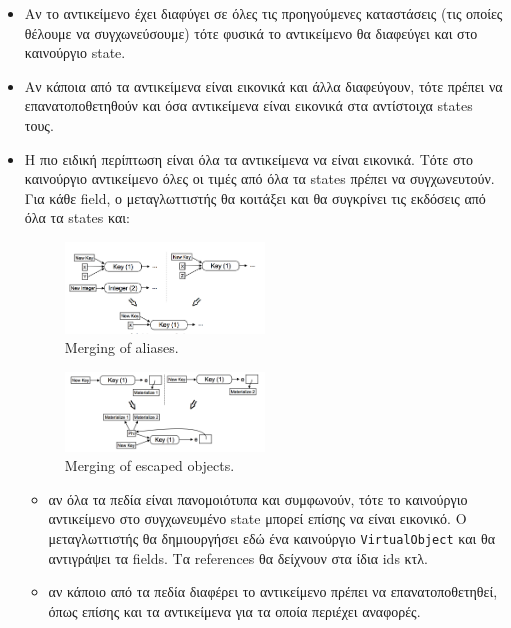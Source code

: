 \begin{itemize}

\item Αν το αντικείμενο έχει διαφύγει σε όλες τις προηγούμενες καταστάσεις (τις
οποίες θέλουμε να συγχωνεύσουμε) τότε φυσικά το αντικείμενο θα διαφεύγει και στο
καινούργιο state.

\item Αν κάποια από τα αντικείμενα είναι εικονικά και άλλα διαφεύγουν, τότε
πρέπει να επανατοποθετηθούν και όσα αντικείμενα είναι εικονικά στα αντίστοιχα
states τους.

\item Η πιο ειδική περίπτωση είναι όλα τα αντικείμενα να είναι εικονικά. Τότε
στο καινούργιο αντικείμενο όλες οι τιμές από όλα τα states πρέπει να
συγχωνευτούν. Για κάθε field, ο μεταγλωττιστής θα κοιτάξει και θα συγκρίνει τις
εκδόσεις από όλα τα states και:

\begin{figure}[h]
\centering
\includegraphics[width=0.5\textwidth]{merging-aliases.png}
\caption{Merging of aliases. \cite{stadler2014partial}}
\label{figure-41}
\end{figure}

\begin{figure}[h]
\centering
\includegraphics[width=0.5\textwidth]{merging-escaped.png}
\caption{Merging of escaped objects. \cite{stadler2014partial}}
\label{figure-42}
\end{figure}

\begin{itemize}

\item αν όλα τα πεδία είναι πανομοιότυπα και συμφωνούν, τότε το καινούργιο
αντικείμενο στο συγχωνευμένο state μπορεί επίσης να είναι εικονικό. Ο
μεταγλωττιστής θα δημιουργήσει εδώ ένα καινούργιο \texttt{VirtualObject} και θα
αντιγράψει τα fields. Τα references θα δείχνουν στα ίδια ids κτλ.

\item αν κάποιο από τα πεδία διαφέρει το αντικείμενο πρέπει να επανατοποθετηθεί,
όπως επίσης και τα αντικείμενα για τα οποία περιέχει αναφορές.

\end{itemize}
\end{itemize}

